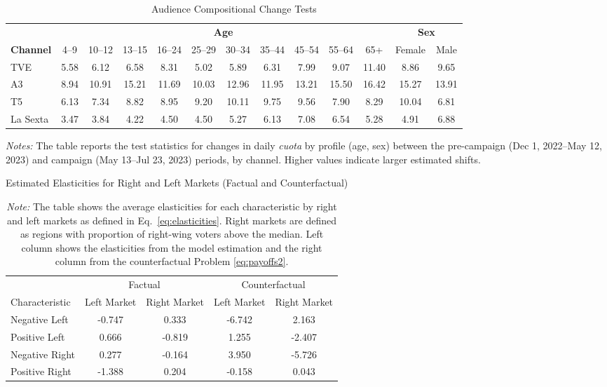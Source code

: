 \documentclass[12pt]{article}
\begin{document}
\begin{table}[!htbp]\centering
	\footnotesize
	\caption{Audience Compositional Change Tests}
	\label{tab:compositional}
	\begin{threeparttable}
		\begin{tabular}{lcccccccccc|cc}
			\toprule
			& \multicolumn{10}{c}{\textbf{Age}} & \multicolumn{2}{c}{\textbf{Sex}} \\
			\cmidrule(lr){2-11}\cmidrule(lr){12-13}
			\textbf{Channel} & 4--9 & 10--12 & 13--15 & 16--24 & 25--29 & 30--34 & 35--44 & 45--54 & 55--64 & 65+ & Female & Male \\
			\midrule
			TVE      & 5.58 & 6.12 & 6.58 & 8.31 & 5.02 & 5.89 & 6.31 & 7.99 & 9.07 & 11.40 & 8.86 & 9.65 \\
			A3       & 8.94 & 10.91 & 15.21 & 11.69 & 10.03 & 12.96 & 11.95 & 13.21 & 15.50 & 16.42 & 15.27 & 13.91 \\
			T5       & 6.13 & 7.34 & 8.82 & 8.95 & 9.20 & 10.11 & 9.75 & 9.56 & 7.90 & 8.29 & 10.04 & 6.81 \\
			La Sexta & 3.47 & 3.84 & 4.22 & 4.50 & 4.50 & 5.27 & 6.13 & 7.08 & 6.54 & 5.28 & 4.91 & 6.88 \\
			\bottomrule
		\end{tabular}
		\begin{tablenotes}\footnotesize
			\item \textit{Notes:} The table reports the test statistics for changes in daily \emph{cuota} by profile (age, sex) between the pre-campaign (Dec 1, 2022–May 12, 2023) and campaign (May 13–Jul 23, 2023) periods, by channel. Higher values indicate larger estimated shifts. 
		\end{tablenotes}
	\end{threeparttable}
\end{table}



\begin{table}[!htb]
	\centering
	\caption{Estimated Elasticities for Right and Left Markets (Factual and Counterfactual)}
	\begin{tabular}{l|cc|cc}
		\toprule
		& \multicolumn{2}{c|}{Factual} & \multicolumn{2}{c}{Counterfactual} \\
		Characteristic & Left Market & Right Market & Left Market & Right Market \\
		\midrule
		Negative Left & -0.747 & 0.333 & -6.742 & 2.163 \\
		Positive Left & 0.666 & -0.819 & 1.255 & -2.407 \\
		Negative Right & 0.277 & -0.164 & 3.950 & -5.726 \\
		Positive Right & -1.388 & 0.204 & -0.158 & 0.043 \\
		\bottomrule
	\end{tabular}
	\caption*{\textit{Note:} \small The table shows the average elasticities for each characteristic by right and left markets as defined in Eq.~\ref{eq:elasticities}. Right markets are defined as regions with proportion of right-wing voters above the median. Left column shows the elasticities from the model estimation and the right column from the counterfactual Problem \ref{eq:payoffs2}.}
	\label{tab:elasticities_count}
\end{table}
\end{document}
